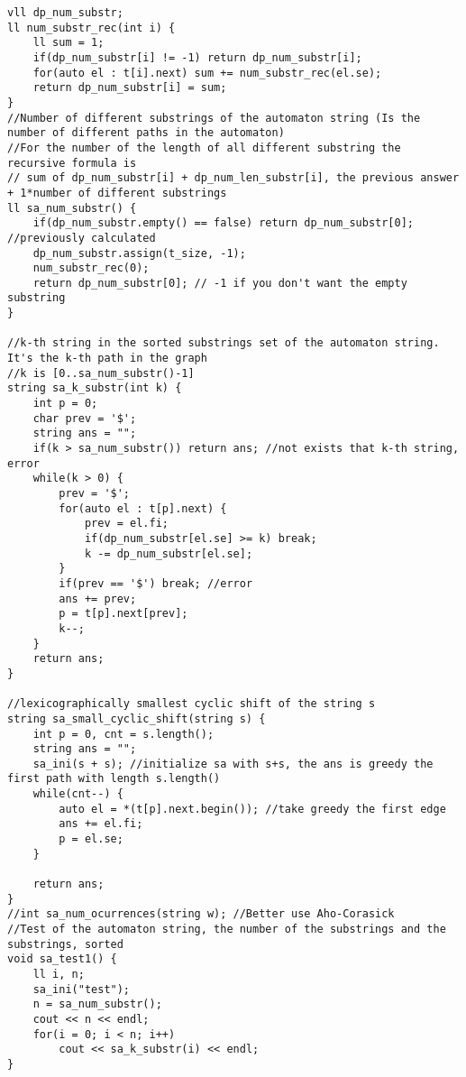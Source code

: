 \documentclass[a4paper]{article}
\begin{document}
\begin{verbatim}
vll dp_num_substr;
ll num_substr_rec(int i) {
    ll sum = 1;
    if(dp_num_substr[i] != -1) return dp_num_substr[i];
    for(auto el : t[i].next) sum += num_substr_rec(el.se);
    return dp_num_substr[i] = sum;
}
//Number of different substrings of the automaton string (Is the number of different paths in the automaton)
//For the number of the length of all different substring the recursive formula is
// sum of dp_num_substr[i] + dp_num_len_substr[i], the previous answer + 1*number of different substrings
ll sa_num_substr() {
    if(dp_num_substr.empty() == false) return dp_num_substr[0]; //previously calculated
    dp_num_substr.assign(t_size, -1);
    num_substr_rec(0);
    return dp_num_substr[0]; // -1 if you don't want the empty substring
}

//k-th string in the sorted substrings set of the automaton string. It's the k-th path in the graph
//k is [0..sa_num_substr()-1]
string sa_k_substr(int k) {
    int p = 0;
    char prev = '$';
    string ans = "";
    if(k > sa_num_substr()) return ans; //not exists that k-th string, error
    while(k > 0) {
        prev = '$';
        for(auto el : t[p].next) {
            prev = el.fi;
            if(dp_num_substr[el.se] >= k) break;
            k -= dp_num_substr[el.se];
        }
        if(prev == '$') break; //error
        ans += prev;
        p = t[p].next[prev];
        k--;
    }
    return ans;
}

//lexicographically smallest cyclic shift of the string s
string sa_small_cyclic_shift(string s) {
    int p = 0, cnt = s.length();
    string ans = "";
    sa_ini(s + s); //initialize sa with s+s, the ans is greedy the first path with length s.length()
    while(cnt--) {
        auto el = *(t[p].next.begin()); //take greedy the first edge
        ans += el.fi;
        p = el.se;
    }

    return ans;
}
//int sa_num_ocurrences(string w); //Better use Aho-Corasick
//Test of the automaton string, the number of the substrings and the substrings, sorted
void sa_test1() {
    ll i, n;
    sa_ini("test");
    n = sa_num_substr();
    cout << n << endl;
    for(i = 0; i < n; i++)
        cout << sa_k_substr(i) << endl;
}
\end{verbatim}
\end{document}
